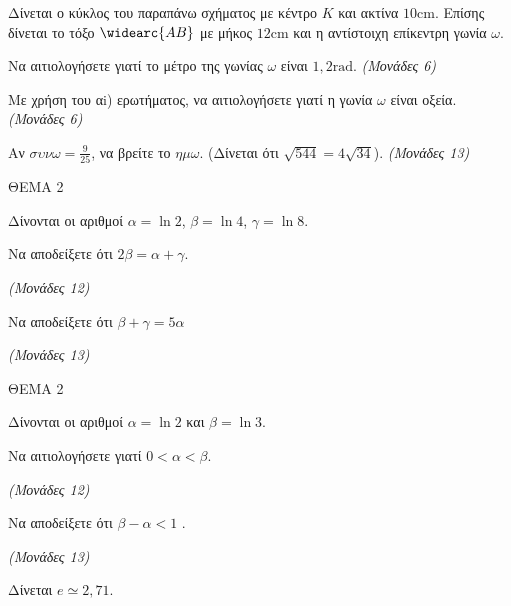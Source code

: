 \documentclass[11pt,a4paper,twoside]{book}
\newcommand{\monades}[1]{\hfill \textit{(Μονάδες #1)}}
\begin{document}
Δίνεται ο κύκλος του παραπάνω σχήματος με κέντρο $K$ και ακτίνα $10\text{cm}$. Επίσης δίνεται το τόξο $\widearc{AB}$ με μήκος $12\text{cm}$ και η αντίστοιχη επίκεντρη γωνία $\omega$.

\begin{alist}
\item \begin{rlist}
\item Να αιτιολογήσετε γιατί το μέτρο της γωνίας $\omega$ είναι $1,2\text{rad}$. \monades{6}
\item Με χρήση του αi) ερωτήματος, να αιτιολογήσετε γιατί η γωνία $\omega$ είναι οξεία. \monades{6}
\end{rlist}
\item Αν $\sigma\upsilon\nu\omega = \frac{9}{25}$, να βρείτε το $\eta\mu\omega$. (Δίνεται ότι $\sqrt{544} = 4\sqrt{34}$). \monades{13}
\end{alist}

\vspace{4mm}

ΘΕΜΑ 2

Δίνονται οι αριθμοί $\alpha = \ln 2$, $\beta = \ln 4$, $\gamma = \ln 8$.

\begin{alist}
\item Να αποδείξετε ότι $2\beta = \alpha + \gamma$.

\monades{12}

\item Να αποδείξετε ότι $\beta + \gamma = 5\alpha$

\monades{13}
\end{alist}

\vspace{4mm}

ΘΕΜΑ 2

Δίνονται οι αριθμοί $\alpha = \ln 2$ και $\beta = \ln 3$.

\begin{alist}
\item Να αιτιολογήσετε γιατί $0 < \alpha < \beta$.

\monades{12}

\item Να αποδείξετε ότι $\beta - \alpha < 1$ .

\monades{13}

Δίνεται $e \simeq 2{,}71$.
\end{alist}

\vspace{4mm}
\end{document}
